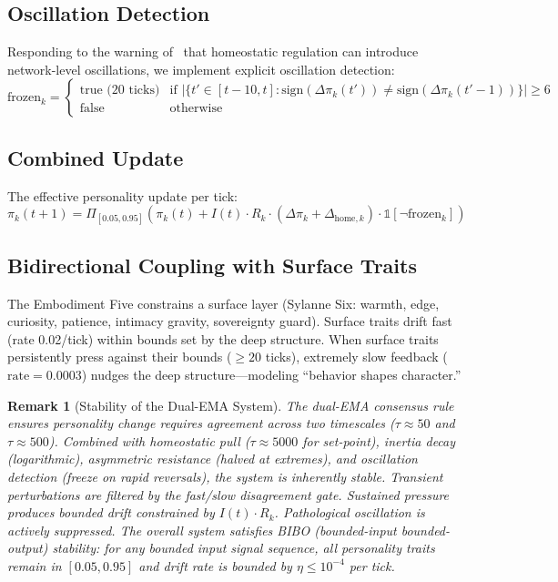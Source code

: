 \documentclass[11pt]{article}
\newtheorem{remark}[theorem]{Remark}
\begin{document}
\subsection{Oscillation Detection}

Responding to the warning of~\cite{stability2015} that homeostatic regulation can introduce network-level oscillations, we implement explicit oscillation detection:
\begin{equation}
\text{frozen}_k = \begin{cases} \text{true (20 ticks)} & \text{if } |\{t' \in [t{-}10, t] : \text{sign}(\Delta\pi_k(t')) \neq \text{sign}(\Delta\pi_k(t'{-}1))\}| \geq 6 \\ \text{false} & \text{otherwise} \end{cases}
\end{equation}

\subsection{Combined Update}

The effective personality update per tick:
\begin{equation}
\pi_k(t+1) = \Pi_{[0.05, 0.95]}\!\left(\pi_k(t) + I(t) \cdot R_k \cdot (\Delta\pi_k + \Delta_{\text{home},k}) \cdot \mathbb{1}[\neg\text{frozen}_k]\right)
\end{equation}

\subsection{Bidirectional Coupling with Surface Traits}

The Embodiment Five constrains a surface layer (Sylanne Six: warmth, edge, curiosity, patience, intimacy gravity, sovereignty guard). Surface traits drift fast (rate 0.02/tick) within bounds set by the deep structure. When surface traits persistently press against their bounds ($\geq 20$ ticks), extremely slow feedback ($\text{rate} = 0.0003$) nudges the deep structure---modeling ``behavior shapes character.''

\begin{remark}[Stability of the Dual-EMA System]
The dual-EMA consensus rule ensures personality change requires agreement across two timescales ($\tau \approx 50$ and $\tau \approx 500$). Combined with homeostatic pull ($\tau \approx 5000$ for set-point), inertia decay (logarithmic), asymmetric resistance (halved at extremes), and oscillation detection (freeze on rapid reversals), the system is inherently stable. Transient perturbations are filtered by the fast/slow disagreement gate. Sustained pressure produces bounded drift constrained by $I(t) \cdot R_k$. Pathological oscillation is actively suppressed. The overall system satisfies BIBO (bounded-input bounded-output) stability: for any bounded input signal sequence, all personality traits remain in $[0.05, 0.95]$ and drift rate is bounded by $\eta \leq 10^{-4}$ per tick.
\end{remark}
\end{document}
